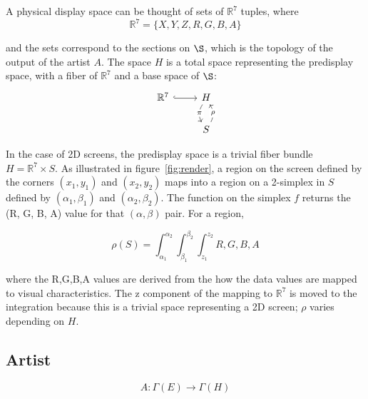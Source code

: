 \documentclass[../main.tex]{subfiles}
\begin{document}
A physical display space can be thought of sets of $\mathbb{R}^{7}$ tuples, where 
\begin{equation}
    \mathbb{R}^{7} = \{X, Y, Z, R, G, B, A\}
\end{equation}

and the sets correspond to the sections on $\S$, which is the topology of the output of the artist $A$. The space $H$ is a total space representing the predisplay space, with a fiber of $\mathbb{R}^7$ and a base space of $\S$:
\begin{equation}
    \begin{tikzcd}
        \mathbb{R}^{7} \arrow[r, hook] & H \arrow[d, "\pi" description, bend right] \\
                                    & S \arrow[u, "\rho" description, bend right] 
    \end{tikzcd}
\end{equation}


In the case of 2D screens, the predisplay space is a trivial fiber bundle $H=\mathbb{R}^{7}\times S$. As illustrated in figure~\ref{fig:render}, a region on the screen defined by the corners $(x_1, y_1)$ and $(x_2, y_2)$ maps into a region on a 2-simplex in $S$ defined by $(\alpha_1, \beta_1)$ and $(\alpha_2, \beta_2)$. The function on the simplex $f$ returns the (R, G, B, A) value for that $(\alpha, \beta)$ pair. For a region, 

\begin{equation*}
\rho(S) = \int_{\alpha_1}^{\alpha_2}\int_{\beta_1}^{\beta_2}\int_{z_1}^{z_2}{R, G, B, A}  
\end{equation*}

where the R,G,B,A values are derived from the how the data values are mapped to visual characteristics. The z component of the mapping to $\mathbb{R}^7$ is moved to the integration because this is a trivial space representing a 2D screen; $\rho$ varies depending on $H$. 


\subsection{Artist}
\begin{equation}
    A: \Gamma(E) \rightarrow \Gamma(H)
\end{equation}
\end{document}
